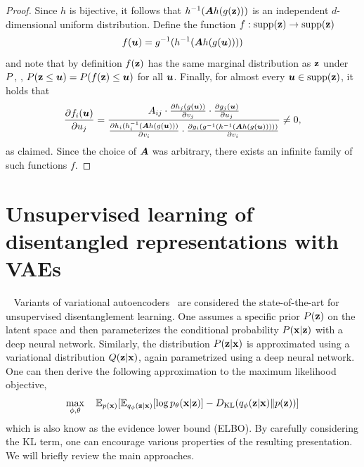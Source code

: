 \begin{proof}
Since $h$ is bijective, it follows that $h^{-1}(\mA h(g(\rvz)))$ is an independent $d$-dimensional uniform distribution.
Define the function $f: \supp(\rvz)\to\supp(\rvz)$
\[
f(\vu) = g^{-1}(h^{-1}(\mA h(g(\vu))))
\]
and note that by definition $f(\rvz)$ has the same marginal distribution as $\rvz$ under $\P$, \ie, $\P(\rvz \leq \vu) = \P(f(\rvz) \leq \vu)$ for all $\vu$.
Finally, for almost every $\vu\in\supp(\rvz)$, it holds that
\[
\frac{\partial f_i(\vu)}{\partial u_j} 
= 
\frac{A_{ij} \cdot\frac{\partial h_j(g(\vu))}{\partial v_j}\cdot \frac{\partial g_j(\vu)}{\partial u_j}}
{\frac{\partial h_i(h_i^{-1}(\mA h(g(\vu)))}{\partial v_i} \cdot \frac{\partial g_i(g^{-1}(h^{-1}(\mA h(g(\vu)))))}{\partial v_i}}
\neq 0,
\]
as claimed.
Since the choice of $\mA$ was arbitrary, there exists an infinite family of such functions $f$.
\end{proof}

\section{Unsupervised learning of disentangled representations with VAEs}~\label{app:methods}
Variants of variational autoencoders~\cite{kingma2013auto} are considered the state-of-the-art for unsupervised disentanglement learning. 
One assumes a specific prior $\P(\rvz)$ on the latent space and then parameterizes the conditional probability $\P(\rvx|\rvz)$ with a deep neural network. 
Similarly, the distribution $\P(\rvz|\rvx)$ is approximated using a variational distribution  $\Q(\rvz|\rvx)$, again parametrized using a deep neural network. One can then derive the following approximation to the maximum likelihood objective, 
\begin{align}
\max_{\phi, \theta}\quad \E_{p(\rvx)} [\E_{q_\phi(\rvz|\rvx)}[\log p_\theta(\rvx|\rvz)] -  \KL(q_\phi(\rvz|\rvx) \| p(\rvz))]\label{eq:elbo}
\end{align}
which is also know as the evidence lower bound (ELBO). By carefully considering the KL term, one can encourage various properties of the resulting presentation. We will briefly review the main approaches. 
